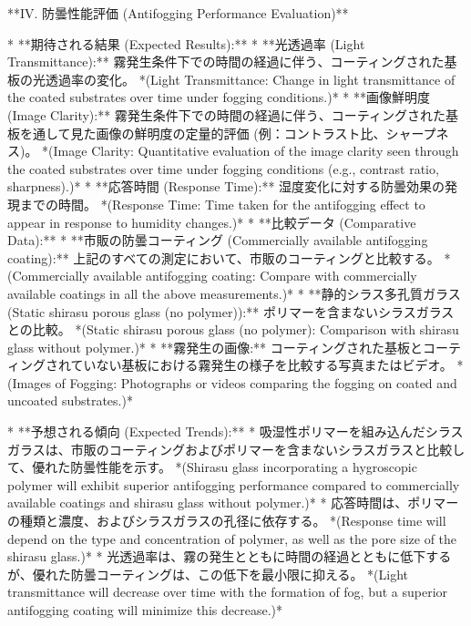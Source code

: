 \documentclass{article}
\begin{document}
**IV. 防曇性能評価 (Antifogging Performance Evaluation)**

*   **期待される結果 (Expected Results):**
    *   **光透過率 (Light Transmittance):** 霧発生条件下での時間の経過に伴う、コーティングされた基板の光透過率の変化。
        *(Light Transmittance: Change in light transmittance of the coated substrates over time under fogging conditions.)*
    *   **画像鮮明度 (Image Clarity):** 霧発生条件下での時間の経過に伴う、コーティングされた基板を通して見た画像の鮮明度の定量的評価 (例：コントラスト比、シャープネス)。
        *(Image Clarity: Quantitative evaluation of the image clarity seen through the coated substrates over time under fogging conditions (e.g., contrast ratio, sharpness).)*
    *   **応答時間 (Response Time):** 湿度変化に対する防曇効果の発現までの時間。
        *(Response Time: Time taken for the antifogging effect to appear in response to humidity changes.)*
    *   **比較データ (Comparative Data):**
        *   **市販の防曇コーティング (Commercially available antifogging coating):** 上記のすべての測定において、市販のコーティングと比較する。
            *(Commercially available antifogging coating: Compare with commercially available coatings in all the above measurements.)*
        *   **静的シラス多孔質ガラス (Static shirasu porous glass (no polymer)):** ポリマーを含まないシラスガラスとの比較。
            *(Static shirasu porous glass (no polymer): Comparison with shirasu glass without polymer.)*
    *   **霧発生の画像:** コーティングされた基板とコーティングされていない基板における霧発生の様子を比較する写真またはビデオ。
        *(Images of Fogging: Photographs or videos comparing the fogging on coated and uncoated substrates.)*

*   **予想される傾向 (Expected Trends):**
    *   吸湿性ポリマーを組み込んだシラスガラスは、市販のコーティングおよびポリマーを含まないシラスガラスと比較して、優れた防曇性能を示す。
        *(Shirasu glass incorporating a hygroscopic polymer will exhibit superior antifogging performance compared to commercially available coatings and shirasu glass without polymer.)*
    *   応答時間は、ポリマーの種類と濃度、およびシラスガラスの孔径に依存する。
        *(Response time will depend on the type and concentration of polymer, as well as the pore size of the shirasu glass.)*
    *   光透過率は、霧の発生とともに時間の経過とともに低下するが、優れた防曇コーティングは、この低下を最小限に抑える。
        *(Light transmittance will decrease over time with the formation of fog, but a superior antifogging coating will minimize this decrease.)*
\end{document}
